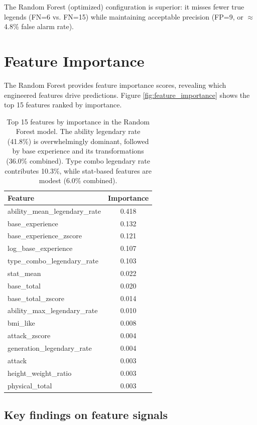 The Random Forest (optimized) configuration is superior: it misses fewer true legends (FN=6 vs. FN=15) while maintaining acceptable precision (FP=9, or $\approx$ 4.8\% false alarm rate).

\section{Feature Importance}
\label{sec:feature_importance}

The Random Forest provides feature importance scores, revealing which engineered features drive predictions. Figure \ref{fig:feature_importance} shows the top 15 features ranked by importance.

\begin{table}[h]
  \centering
  \begin{tabular}{|l|c|}
    \hline
    \textbf{Feature} & \textbf{Importance} \\
    \hline
    ability\_mean\_legendary\_rate & 0.418 \\
    base\_experience & 0.132 \\
    base\_experience\_zscore & 0.121 \\
    log\_base\_experience & 0.107 \\
    type\_combo\_legendary\_rate & 0.103 \\
    stat\_mean & 0.022 \\
    base\_total & 0.020 \\
    base\_total\_zscore & 0.014 \\
    ability\_max\_legendary\_rate & 0.010 \\
    bmi\_like & 0.008 \\
    attack\_zscore & 0.004 \\
    generation\_legendary\_rate & 0.004 \\
    attack & 0.003 \\
    height\_weight\_ratio & 0.003 \\
    physical\_total & 0.003 \\
    \hline
  \end{tabular}
  \caption{Top 15 features by importance in the Random Forest model. The ability legendary rate (41.8\%) is overwhelmingly dominant, followed by base experience and its transformations (36.0\% combined). Type combo legendary rate contributes 10.3\%, while stat-based features are modest (6.0\% combined).}
  \label{tab:feature_importance}
\end{table}

\subsection{Key findings on feature signals}

